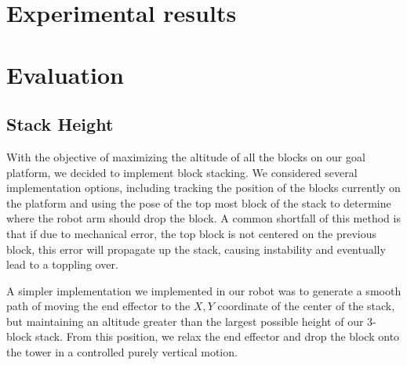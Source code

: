 \documentclass{article}
\begin{document}
    
    
    




\section{Experimental results}


  
\section{Evaluation}

     \subsection{Stack Height}
		With the objective of maximizing the altitude of all the blocks on our goal platform, we decided to implement block stacking. We considered several implementation options, including tracking the position of the blocks currently on the platform and using the pose of the top most block of the stack to determine where the robot arm should drop the block. A common shortfall of this method is that if due to mechanical error, the top block is not centered on the previous block, this error will propagate up the stack, causing instability and eventually lead to a toppling over.
		
		A simpler implementation we implemented in our robot was to generate a smooth path of moving the end effector to the $X, Y$ coordinate of the center of the stack, but maintaining an altitude greater than the largest possible height of our 3-block stack. From this position, we relax the end effector and drop the block onto the tower in a controlled purely vertical motion.
	
\end{document}
